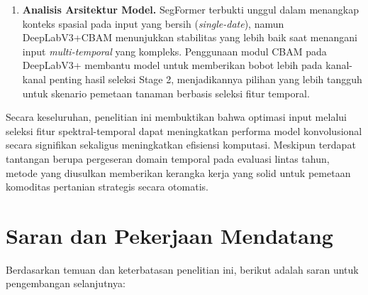 \begin{enumerate}
    \item \textbf{Analisis Arsitektur Model.}
    SegFormer terbukti unggul dalam menangkap konteks spasial pada input yang bersih (\textit{single-date}), namun DeepLabV3+CBAM menunjukkan stabilitas yang lebih baik saat menangani input \textit{multi-temporal} yang kompleks. Penggunaan modul CBAM pada DeepLabV3+ membantu model untuk memberikan bobot lebih pada kanal-kanal penting hasil seleksi Stage 2, menjadikannya pilihan yang lebih tangguh untuk skenario pemetaan tanaman berbasis seleksi fitur temporal.

\end{enumerate}

Secara keseluruhan, penelitian ini membuktikan bahwa optimasi input melalui seleksi fitur spektral-temporal dapat meningkatkan performa model konvolusional secara signifikan sekaligus meningkatkan efisiensi komputasi. Meskipun terdapat tantangan berupa pergeseran domain temporal pada evaluasi lintas tahun, metode yang diusulkan memberikan kerangka kerja yang solid untuk pemetaan komoditas pertanian strategis secara otomatis.

\section{Saran dan Pekerjaan Mendatang}

Berdasarkan temuan dan keterbatasan penelitian ini, berikut adalah saran untuk pengembangan selanjutnya:

